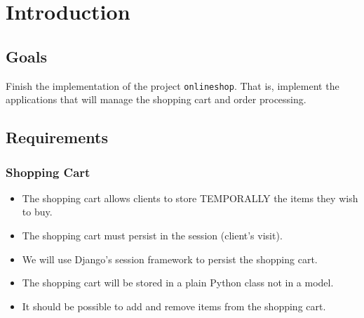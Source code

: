 \documentclass[12pt]{article} %
\newcommand{\project}{\texttt{onlineshop}}%
\begin{document}

\tableofcontents %

\newpage %




\section{Introduction}
\subsection {Goals }

Finish the implementation of the project \project{}. That is, implement the applications that will manage the shopping cart and order processing.

\subsection {Requirements }
\subsubsection{Shopping Cart}

\begin{itemize}
    \item The shopping cart allows clients to store TEMPORALLY the items they wish to buy.
    \item The shopping cart must persist in the session (client's visit).
    \item We will use Django's session framework to persist the shopping cart.
    \item The shopping cart will be stored in a plain Python class not in a model.
    \item It should be possible to add and remove items from the shopping cart.
\end{itemize}
\end{document}
